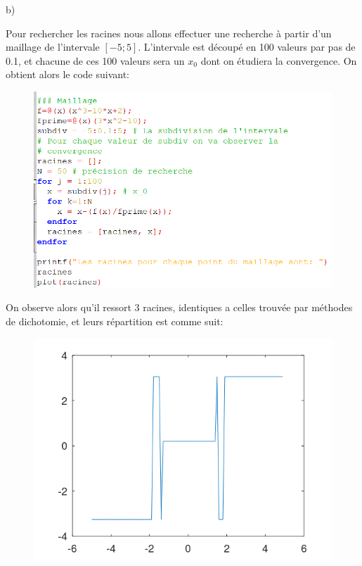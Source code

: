 \documentclass{article}
\begin{document}
	b)	
	
	Pour rechercher les racines nous allons effectuer une recherche à partir d'un maillage de l'intervale $[-5; 5]$.
	L'intervale est découpé en 100 valeurs par pas de 0.1, et chacune de ces 100 valeurs sera un $x_{0}$ dont on étudiera la convergence. On obtient alors le code suivant: 
	
	\begin{center}
		\begin{figure}[H]
			\includegraphics[scale=1]{./img/newton1.png}
		\end{figure}
	\end{center}
	
	On observe alors qu'il ressort 3 racines, identiques a celles trouvée par méthodes de dichotomie, et leurs répartition est comme suit:

	\begin{center}
		\begin{figure}[H]
			\includegraphics[scale=0.80]{./img/newton_conv_subdiv.png}
		\end{figure}
	\end{center}
	
\end{document}
